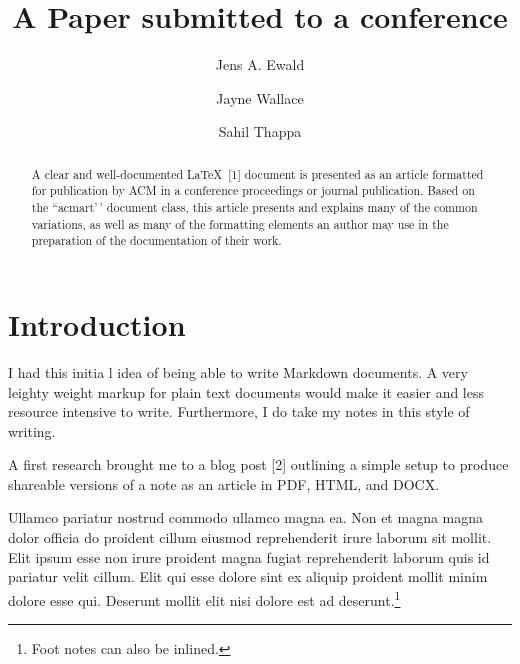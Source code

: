 \documentclass[sigconf,]{acmart}
\begin{document}
% 
  \title{A Paper submitted to a conference}

\author{Jens A. Ewald}
\author{Jayne Wallace}
\author{Sahil Thappa}
\authornotemark[1]
\email{}

\begin{abstract}
A clear and well-documented \LaTeX~{[}1{]} document is presented as an
article formatted for publication by ACM in a conference proceedings or
journal publication. Based on the ``acmart'\,' document class, this
article presents and explains many of the common variations, as well as
many of the formatting elements an author may use in the preparation of
the documentation of their work.
\end{abstract}

\renewcommand{\shortauthors}{}

\maketitle



\hypertarget{introduction}{%
\section{Introduction}\label{introduction}}

I had this initia l idea of being able to write Markdown documents. A
very leighty weight markup for plain text documents would make it easier
and less resource intensive to write. Furthermore, I do take my notes in
this style of writing.

A first research brought me to a blog post {[}2{]} outlining a simple
setup to produce shareable versions of a note as an article in PDF,
HTML, and DOCX.

Ullamco pariatur nostrud commodo ullamco magna ea. Non et magna magna
dolor officia do proident cillum eiusmod reprehenderit irure laborum sit
mollit. Elit ipsum esse non irure proident magna fugiat reprehenderit
laborum quis id pariatur velit cillum. Elit qui esse dolore sint ex
aliquip proident mollit minim dolore esse qui. Deserunt mollit elit nisi
dolore est ad deserunt.\footnote{Foot notes can also be inlined.}
\end{document}
